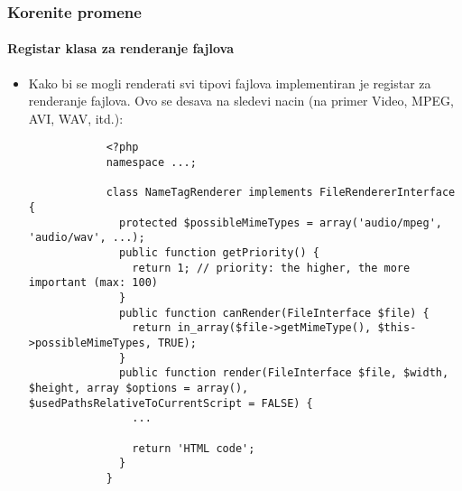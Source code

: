 
\begin{frame}[fragile]
	\frametitle{Korenite promene}
	\framesubtitle{Registar klasa za renderanje fajlova}

	\lstset{
		basicstyle=\tiny\ttfamily
	}

	\begin{itemize}
		\item Kako bi se mogli renderati svi tipovi fajlova implementiran je registar za renderanje fajlova.\newline
			Ovo se desava na sledevi nacin (na primer Video, MPEG, AVI, WAV, itd.):

		\begin{lstlisting}
			<?php
			namespace ...;

			class NameTagRenderer implements FileRendererInterface {
			  protected $possibleMimeTypes = array('audio/mpeg', 'audio/wav', ...);
			  public function getPriority() {
			    return 1; // priority: the higher, the more important (max: 100)
			  }
			  public function canRender(FileInterface $file) {
			    return in_array($file->getMimeType(), $this->possibleMimeTypes, TRUE);
			  }
			  public function render(FileInterface $file, $width, $height, array $options = array(), $usedPathsRelativeToCurrentScript = FALSE) {
			    ...

			    return 'HTML code';
			  }
			}
		\end{lstlisting}

	\end{itemize}

\end{frame}


